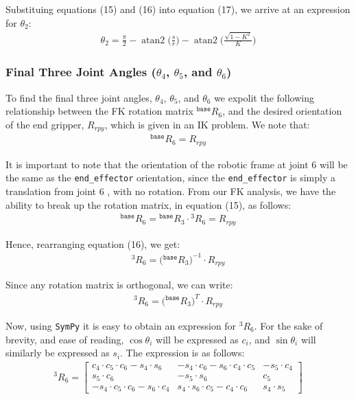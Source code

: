\documentclass[a4paper]{article}
\DeclareMathOperator{\atantwo}{atan2}
\begin{document}
Substituing equations (15) and (16) into equation (17), we arrive at an expression for $\theta_2$:
\begin{align}
\theta_2 = \frac{\pi}{2} - \atantwo \bigg(\frac{s}{r}\bigg) - \atantwo \bigg(\frac{\sqrt{1 - K^2}}{K}\bigg)
\end{align}

\subsubsection{Final Three Joint Angles ($\theta_4$, $\theta_5$, and $\theta_6$)}
To find the final three joint angles, $\theta_4$, $\theta_5$, and $\theta_6$ we expolit the following relationship between the FK rotation matrix $^\texttt{base} R_6$, and the desired orientation of the end gripper, $R_{rpy}$, which is given in an IK problem. We note that:
\begin{align}
^\texttt{base} R_6 = R_{rpy}
\end{align}

It is important to note that the orientation of the robotic frame at joint 6 will be the same as the \verb|end_effector| orientation, since the \verb|end_effector| is simply a translation from joint 6 , with no rotation. From our FK analysis, we have the ability to break up the rotation matrix, in equation (15), as follows:
\begin{align}
^\texttt{base} R_6 = {}^{\texttt{base}}R_3 \cdot {}^{3}R_6 = R_{rpy}
\end{align}

Hence, rearranging equation (16), we get:
\begin{align*}
^3 R_6 = \big({}^{\texttt{base}}R_3\big)^{-1} \cdot R_{rpy}
\end{align*}

Since any rotation matrix is orthogonal, we can write:
\begin{align}
^3 R_6 = \big({}^{\texttt{base}}R_3\big)^{T} \cdot R_{rpy}
\end{align}

Now, using \verb|SymPy| it is easy to obtain an expression for $^3 R_6$. For the sake of brevity, and ease of reading, $\cos \theta_i$ will be expressed as $c_i$, and $\sin \theta_i$ will similarly be expressed as $s_i$. The expression is as follows:
\begin{align}
^3 R_6 =
\begin{bmatrix}
c_4 \cdot c_5 \cdot c_6 - s_4 \cdot s_6 & -s_4 \cdot c_6 - s_6 \cdot c_4 \cdot c_5 & -s_5 \cdot c_4\\
s_5 \cdot c_6 & -s_5 \cdot s_6 & c_5\\
-s_4 \cdot c_5 \cdot c_6 - s_6 \cdot c_4 & s_4 \cdot s_6 \cdot c_5 - c_4 \cdot c_6 & s_4 \cdot s_5
\end{bmatrix}
\end{align}
\end{document}
